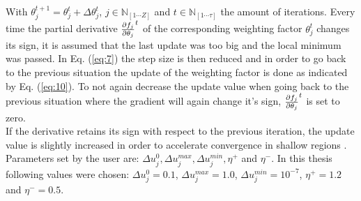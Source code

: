 With $\theta_j^{t+1} = \theta_j^{t} + \Delta \theta^t_j$, $j \in \mathbb{N}_{[1\cdots Z]}$ and $t \in \mathbb{N}_{[1 \cdots \mathbb{\tau}]}$ the amount of iterations. Every time the partial derivative $\pdv{f_j}{\theta_j}^t$ of the corresponding weighting factor $\theta_j^t$ changes its sign, it is assumed that the last update was too big and the local minimum was passed. In Eq. (\ref{eq:7}) the step size is then reduced and in order to go back to the previous situation the update of the weighting factor is done as indicated by Eq. (\ref{eq:10}). To not again decrease the update value when going back to the previous situation where the gradient will again change it's sign,  $\pdv{f_j}{\theta_j}^{t}$ is set to zero.\\
If the derivative retains its sign with respect to the previous iteration, the update value is slightly increased in order to accelerate convergence in shallow regions \cite{RPROP}. Parameters set by the user are: $\Delta u^0_j,\Delta u^{max}_j,\Delta u^{min}_j, \eta^+$ and $\eta^-$. In this thesis following values were chosen: $\Delta u^0_j = 0.1$, $\Delta u^{max}_j=1.0$, $\Delta u^{min}_j=10^{-7}$, $\eta^+ = 1.2$ and $\eta^- = 0.5$.

%




